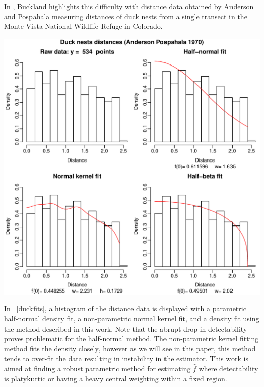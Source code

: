 \documentclass[12pt]{amsart}
\newcommand{\figref}[1]{\figurename~\ref{#1}}
\newenvironment{Figure}{\par\medskip\noindent\minipage{\linewidth}}{\endminipage\par\medskip}
\renewcommand{\hat}{\widehat}
\begin{document}
\begin{multicols}{2}
In \cite{buckland2001introduction}, Buckland highlights this difficulty with distance data obtained by Anderson and Pospahala measuring distances of duck nests from a single transect in the Monte Vista National Wildlife Refuge in Colorado.
\begin{Figure}
  \includegraphics[width=\linewidth]{../duck_nest_fits.pdf}
    \label{duckfits}
\end{Figure}
In \figref{duckfits}, a histogram of the distance data is displayed with a parametric half-normal density fit, a non-parametric normal kernel fit, and a density fit using the method described in this work.
Note that the abrupt drop in detectability proves problematic for the half-normal method.
The non-parametric kernel fitting method fits the density closely, however as we will see in this paper, this method tends to over-fit the data resulting in instability in the estimator.
This work is aimed at finding a robust parametric method for estimating $\hat f$ where detectability is platykurtic or having a heavy central weighting within a fixed region.


\end{multicols}
\end{document}
